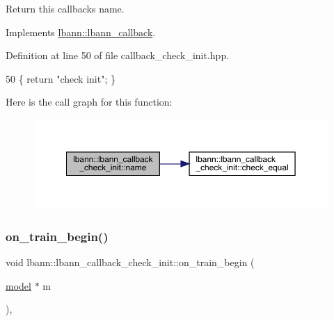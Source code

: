 Return this callback\textquotesingle{}s name. 

Implements \hyperlink{classlbann_1_1lbann__callback_a7522c7a14f1d6a1ea762cc2d7248eb3a}{lbann\+::lbann\+\_\+callback}.



Definition at line 50 of file callback\+\_\+check\+\_\+init.\+hpp.


\begin{DoxyCode}
50 \{ \textcolor{keywordflow}{return} \textcolor{stringliteral}{"check init"}; \}
\end{DoxyCode}
Here is the call graph for this function\+:\nopagebreak
\begin{figure}[H]
\begin{center}
\leavevmode
\includegraphics[width=350pt]{classlbann_1_1lbann__callback__check__init_a4f8507c26f8e467697fef29ab8463b0f_cgraph}
\end{center}
\end{figure}
\mbox{\label{classlbann_1_1lbann__callback__check__init_a037f1371c56c1b528f487517a58ce3fb}} 
\subsubsection{\texorpdfstring{on\+\_\+train\+\_\+begin()}{on\_train\_begin()}}
{\footnotesize\ttfamily void lbann\+::lbann\+\_\+callback\+\_\+check\+\_\+init\+::on\+\_\+train\+\_\+begin (\begin{DoxyParamCaption}\item[{\hyperlink{classlbann_1_1model}{model} $\ast$}]{m }\end{DoxyParamCaption})\hspace{0.3cm}{\ttfamily [override]}, {\ttfamily [virtual]}}

